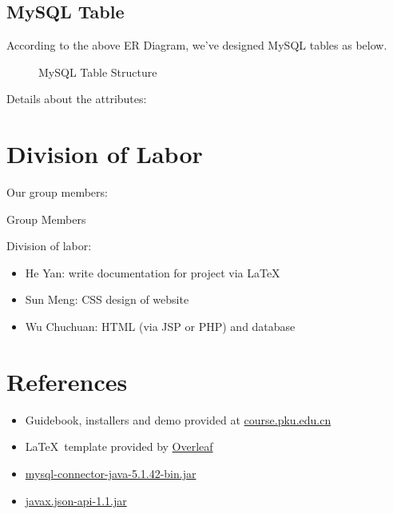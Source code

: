 \subsection{MySQL Table}

According to the above ER Diagram, we've designed MySQL tables as below.

\begin{figure}[htbp]
\begin{center}

\end{center}
\caption{MySQL Table Structure}
\end{figure}

Details about the attributes:



\section{Division of Labor}

Our group members:

\begin{table}[htbp]
	\begin{center}
		
	\end{center}
	\caption{Group Members}
\end{table}

Division of labor:

\begin{itemize}
	\item He Yan: write documentation for project via \LaTeX
	\item Sun Meng: CSS design of website
	\item Wu Chuchuan: HTML (via JSP or PHP) and database
\end{itemize}

\section{References}

\begin{itemize}
	\item Guidebook, installers and demo provided at \url{course.pku.edu.cn}
	\item \LaTeX \, template provided by \href{https://www.overleaf.com/latex/templates/project-template-titlepage/bwmhgfdvvhpw}{Overleaf}
	\item \href{https://dev.mysql.com/downloads/connector/j/}{mysql-connector-java-5.1.42-bin.jar}
	\item \href{https://mvnrepository.com/artifact/javax.json/javax.json-api/1.1}{javax.json-api-1.1.jar}
\end{itemize}



